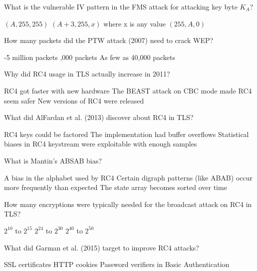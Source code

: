 \documentclass[10pt,a4paper,american]{exam}
\begin{document}
\begin{questions}
	\question What is the vulnerable IV pattern in the FMS attack for attacking key byte $K_A$?
	\begin{randomizechoices}
		\choice $(A, 255, 255)$
		\CorrectChoice $(A+3, 255, x)$ where x is any value
		\choice $(255, A, 0)$
	\end{randomizechoices}

	\question How many packets did the PTW attack (2007) need to crack WEP?
	\begin{randomizechoices}
		-5 million packets
		,000 packets
		\CorrectChoice As few as 40,000 packets
	\end{randomizechoices}

	\question Why did RC4 usage in TLS actually increase in 2011?
	\begin{randomizechoices}
		\choice RC4 got faster with new hardware
		\CorrectChoice The BEAST attack on CBC mode made RC4 seem safer
		\choice New versions of RC4 were released
	\end{randomizechoices}

	\question What did AlFardan et al. (2013) discover about RC4 in TLS?
	\begin{randomizechoices}
		\choice RC4 keys could be factored
		\choice The implementation had buffer overflows
		\CorrectChoice Statistical biases in RC4 keystream were exploitable with enough samples
	\end{randomizechoices}

	\question What is Mantin's ABSAB bias?
	\begin{randomizechoices}
		\choice A bias in the alphabet used by RC4
		\CorrectChoice Certain digraph patterns (like ABAB) occur more frequently than expected
		\choice The state array becomes sorted over time
	\end{randomizechoices}

	\question How many encryptions were typically needed for the broadcast attack on RC4 in TLS?
	\begin{randomizechoices}
		\choice $2^{10}$ to $2^{15}$
		\CorrectChoice $2^{24}$ to $2^{30}$
		\choice $2^{40}$ to $2^{50}$
	\end{randomizechoices}

	\question What did Garman et al. (2015) target to improve RC4 attacks?
	\begin{randomizechoices}
		\choice SSL certificates
		\choice HTTP cookies
		\CorrectChoice Password verifiers in Basic Authentication
	\end{randomizechoices}


\end{questions}
\end{document}
